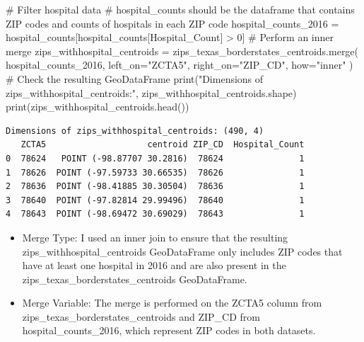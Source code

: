 \documentclass[
  letterpaper,
  DIV=11,
  numbers=noendperiod]{scrartcl}
\newenvironment{Shaded}{\begin{snugshade}}{\end{snugshade}}
\newcommand{\BuiltInTok}[1]{\textcolor[rgb]{0.00,0.23,0.31}{#1}}
\newcommand{\CommentTok}[1]{\textcolor[rgb]{0.37,0.37,0.37}{#1}}
\newcommand{\DecValTok}[1]{\textcolor[rgb]{0.68,0.00,0.00}{#1}}
\newcommand{\NormalTok}[1]{\textcolor[rgb]{0.00,0.23,0.31}{#1}}
\newcommand{\OperatorTok}[1]{\textcolor[rgb]{0.37,0.37,0.37}{#1}}
\newcommand{\StringTok}[1]{\textcolor[rgb]{0.13,0.47,0.30}{#1}}
\begin{document}
\begin{Shaded}
\begin{Highlighting}[]
\CommentTok{\# Filter hospital data }
\CommentTok{\# \textquotesingle{}hospital\_counts\textquotesingle{} should be the dataframe that contains ZIP codes and counts of hospitals in each ZIP code}
\NormalTok{hospital\_counts\_2016 }\OperatorTok{=}\NormalTok{ hospital\_counts[hospital\_counts[}\StringTok{\textquotesingle{}Hospital\_Count\textquotesingle{}}\NormalTok{] }\OperatorTok{\textgreater{}} \DecValTok{0}\NormalTok{]}
\CommentTok{\# Perform an inner merge }
\NormalTok{zips\_withhospital\_centroids }\OperatorTok{=}\NormalTok{ zips\_texas\_borderstates\_centroids.merge(}
\NormalTok{    hospital\_counts\_2016, }
\NormalTok{    left\_on}\OperatorTok{=}\StringTok{"ZCTA5"}\NormalTok{, }
\NormalTok{    right\_on}\OperatorTok{=}\StringTok{"ZIP\_CD"}\NormalTok{, }
\NormalTok{    how}\OperatorTok{=}\StringTok{"inner"}
\NormalTok{)}
\CommentTok{\# Check the resulting GeoDataFrame}
\BuiltInTok{print}\NormalTok{(}\StringTok{"Dimensions of zips\_withhospital\_centroids:"}\NormalTok{, zips\_withhospital\_centroids.shape)}
\BuiltInTok{print}\NormalTok{(zips\_withhospital\_centroids.head())}
\end{Highlighting}
\end{Shaded}

\begin{verbatim}
Dimensions of zips_withhospital_centroids: (490, 4)
   ZCTA5                    centroid ZIP_CD  Hospital_Count
0  78624   POINT (-98.87707 30.2816)  78624               1
1  78626  POINT (-97.59733 30.66535)  78626               1
2  78636  POINT (-98.41885 30.30504)  78636               1
3  78640  POINT (-97.82814 29.99496)  78640               1
4  78643  POINT (-98.69472 30.69029)  78643               1
\end{verbatim}

\begin{itemize}
\item
  Merge Type: I used an inner join to ensure that the resulting
  zips\_withhospital\_centroids GeoDataFrame only includes ZIP codes
  that have at least one hospital in 2016 and are also present in the
  zips\_texas\_borderstates\_centroids GeoDataFrame.
\item
  Merge Variable: The merge is performed on the ZCTA5 column from
  zips\_texas\_borderstates\_centroids and ZIP\_CD from
  hospital\_counts\_2016, which represent ZIP codes in both datasets.
\end{itemize}
\end{document}
